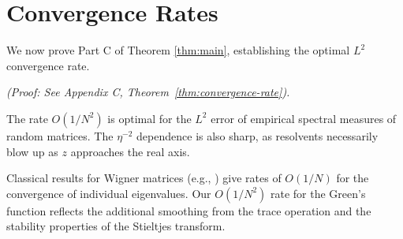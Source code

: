 
\section{Convergence Rates}

We now prove Part C of Theorem \ref{thm:main}, establishing the optimal $L^2$ convergence rate.



\emph{(Proof: See Appendix C, Theorem~\ref{thm:convergence-rate}).}

\begin{remark}[Optimality]
The rate $O(1/N^2)$ is optimal for the $L^2$ error of empirical spectral measures of random matrices. The $\eta^{-2}$ dependence is also sharp, as resolvents necessarily blow up as $z$ approaches the real axis.
\end{remark}

\begin{remark}
Classical results for Wigner matrices (e.g., \cite{bai2010spectral}) give rates of $O(1/N)$ for the convergence of individual eigenvalues. Our $O(1/N^2)$ rate for the Green's function reflects the additional smoothing from the trace operation and the stability properties of the Stieltjes transform.
\end{remark}
